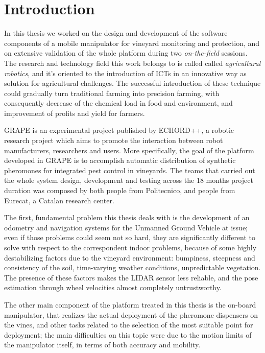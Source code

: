 
\chapter{Introduction} \label{chap:introduction}

In this thesis we worked on the design and development of the software components of a mobile manipulator for vineyard monitoring and protection, and on extensive validation of the whole platform during two \textit{on-the-field} sessions. The research and technology field this work belongs to is called called  \textit{agricultural robotics}, and it's oriented to the introduction of ICTs in an innovative way as solution for agricultural challenges. The successful introduction of these technique could gradually turn traditional farming into precision farming, with consequently decrease of the chemical load in food and environment, and improvement of profits and yield for farmers.

\par \ac{GRAPE} is an experimental project published by \ac{ECHORD++}, a robotic research project which aims to promote the interaction between robot manufacturers, researchers and users. More specifically, the goal of the platform developed in \ac{GRAPE} is to accomplish automatic distribution of synthetic pheromones for integrated pest control in vineyards.
The teams that carried out the whole system design, development and testing across the 18 months project duration was composed by both people from Politecnico, and people from Eurecat, a Catalan research center. 

The first, fundamental problem this thesis deals with is the development of an odometry and navigation systems for the Unmanned Ground Vehicle at issue; even if those problems could seem not so hard, they are significantly different to solve with respect to the correspondent indoor problems, because of some highly destabilizing factors due to the vineyard environment: bumpiness, steepness and consistency of the soil, time-varying weather conditions, unpredictable vegetation. The presence of these factors makes the \ac{LIDAR} sensor less reliable, and the pose estimation through wheel velocities almost completely untrustworthy.

The other main component of the platform treated in this thesis is the on-board manipulator, that realizes the actual deployment of the pheromone dispensers on the vines, and other tasks related to the selection of the most suitable point for deployment; the main difficulties on this topic were due to the motion limits of the manipulator itself, in terms of both accuracy and mobility.

